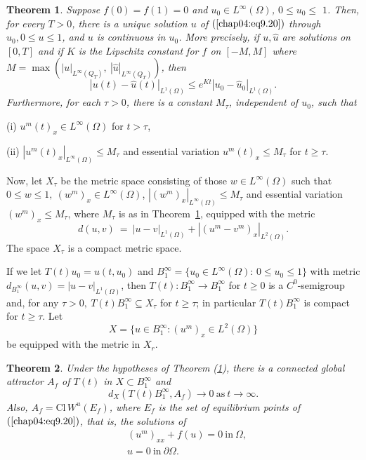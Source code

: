 \documentclass{surv-l}
\theoremstyle{plain}
\newtheorem{theorem}{Theorem}[section]
\theoremstyle{definition}
\numberwithin{equation}{section}
\numberwithin{figure}{chapter}
\begin{document}
\begin{theorem}\label{thm4.9.6} Suppose $f(0)=f(1)=0$ and $u_{0}\in L^{\infty}(\Omega)$, $0\leq u_{0}\leq$
$1$. Then, for every $T>0$, there is a unique solution $u$ of $(\ref{chap04:eq9.20})$ through $u_{0},0\leq u\leq 1$, and $u$ is continuous in $u_{0}$. More precisely, if $u,\hat{u}$ are solutions on $[0, T]$ and if $K$ is the Lipschitz constant for $f$ on $[-M, M]$ where $M=\max(|u|_{L^{\infty}(Q_{T})},\ |\hat{u}|_{L^{\infty}(Q_{T})})$, then
\begin{equation*}
|u(t)-\hat{u}(t)|_{L^{1}(\Omega)}\leq e^{Kt}|u_{0}-\hat{u}_{0}|_{L^{1}(\Omega)}.
\end{equation*}
Furthermore, for each $\tau>0$, there is a constant $M_{\tau}$, independent of $u_{0}$, such that
\end{theorem}



(i) $u^{m}(t)_{x}\in L^{\infty}(\Omega)$ for $t>\tau$,

(ii) $|u^{m}(t)_{x}|_{L^{\infty}(\Omega)}\leq M_{\tau}$ and essential variation $u^{m}(t)_{x}\leq M_{\tau}$ for $t\geq\tau$.


Now, let $X_{\tau}$ be the metric space consisting of those $w\in L^{\infty}(\Omega)$ such that $0\leq w\leq 1,\ (w^{m})_{x}\in L^{\infty}(\Omega)$, $|(w^{m})_{x}|_{L^{\infty}(\Omega)}\leq M_{\tau}$ and essential variation $(w^{m})_{x}\leq M_{\tau}$, where $M_{\tau}$ is as in Theorem~\ref{thm4.9.6}, equipped with the metric
\begin{equation*}
d(u, v)\ =\ |u-v|_{L^{1}(\Omega)} + |(u^{m}-v^{m})_{x}|_{L^{2}(\Omega)}.
\end{equation*}
The space $X_{\tau}$ is a compact metric space.

If we let $T(t)u_{0}=u(t, u_{0})$ and $B_{1}^{\infty}=\{u_{0}\in L^{\infty}(\Omega){:}\, 0\leq u_{0}\leq 1\}$ with metric $d_{B_{1}^\infty}(u, v)=|u-v|_{L^{1}(\Omega)}$, then $T(t): B_{1}^{\infty}\rightarrow B_{1}^{\infty}$ for $t\geq 0$ is a $C^{0}$-semigroup and, for any $\tau>0,\ T(t)B_{1}^{\infty}\subseteq X_{\tau}$ for $t\geq\tau$; in particular $T(t)B_{1}^{\infty}$ is compact for $t\geq\tau$. Let
\begin{equation*}
X=\{u\in B_{1}^{\infty}: (u^{m})_{x}\in L^{2}(\Omega)\}
\end{equation*}
be equipped with the metric in $X_{r}$.

\begin{theorem}\label{thm4.9.7} Under the hypotheses of Theorem \emph{(\ref{thm4.9.6})}, there is a connected global attractor $A_{f}$ of $T(t)$ in $X\subset B_{1}^{\infty}$ and
\begin{equation*}
d_{X}(T(t)B_{1}^{\infty}, A_{f})\rightarrow 0\ \mathrm{as}\ t\rightarrow\infty.
\end{equation*}
Also, $A_{f}= \mathrm{Cl}\, W^{u}(E_{f})$, where $E_{f}$ is the set of equilibrium points of $(\ref{chap04:eq9.20})$, that is, the solutions of
\begin{align*}
& (u^{m})_{xx} + f(u)=0\ \mathrm{in}\ \Omega,\\
& u=0\ \mathrm{in}\ \partial\Omega.
\end{align*}
\end{theorem}
\end{document}
